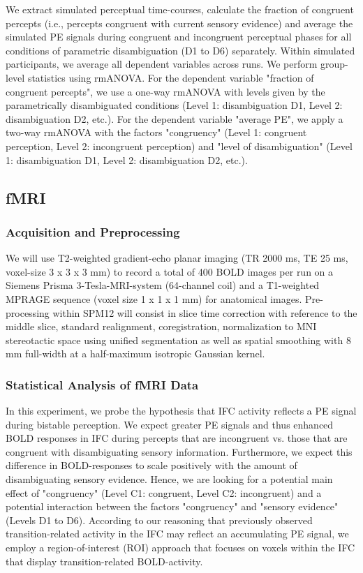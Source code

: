 \documentclass[12pt]{article}
\begin{document}
We extract simulated perceptual time-courses, calculate the fraction of congruent percepts (i.e., percepts congruent with current sensory evidence) and average the simulated PE signals during congruent and incongruent perceptual phases for all conditions of parametric disambiguation (D1 to D6) separately. Within simulated participants, we average all dependent variables across runs. We perform group-level statistics using rmANOVA. For the dependent variable "fraction of congruent percepts", we use a one-way rmANOVA with levels given by the parametrically disambiguated conditions (Level 1: disambiguation D1, Level 2: disambiguation D2, etc.). For the dependent variable "average PE", we apply a two-way rmANOVA with the factors "congruency" (Level 1: congruent perception, Level 2: incongruent perception) and "level of disambiguation" (Level 1: disambiguation D1, Level 2: disambiguation D2, etc.). 

\subsection{fMRI}

\subsubsection{Acquisition and Preprocessing}

We will use T2-weighted gradient-echo planar imaging (TR 2000 ms, TE 25 ms, voxel-size 3 x 3 x 3 mm) to record a total of 400 BOLD images per run on a Siemens Prisma 3-Tesla-MRI-system (64-channel coil) and a T1-weighted MPRAGE sequence (voxel size 1 x 1 x 1 mm) for anatomical images. Pre-processing within SPM12 will consist in slice time correction with reference to the middle slice, standard realignment, coregistration, normalization to MNI stereotactic space using unified segmentation as well as spatial smoothing with 8 mm full-width at a half-maximum isotropic Gaussian kernel.

\subsubsection{Statistical Analysis of fMRI Data}

In this experiment, we probe the hypothesis that IFC activity reflects a PE signal during bistable perception. We expect greater PE signals and thus enhanced BOLD responses in IFC during percepts that are incongruent vs. those that are congruent with disambiguating sensory information. Furthermore, we expect this difference in BOLD-responses to scale positively with the amount of disambiguating sensory evidence. Hence, we are looking for a potential main effect of "congruency" (Level C1: congruent, Level C2: incongruent) and a potential interaction between the factors "congruency" and "sensory evidence" (Levels D1 to D6). According to our reasoning that previously observed transition-related activity in the IFC \parencite{Brascamp2018} may reflect an accumulating PE signal, we employ a region-of-interest (ROI) approach that focuses on voxels within the IFC that display transition-related BOLD-activity.  
\end{document}
